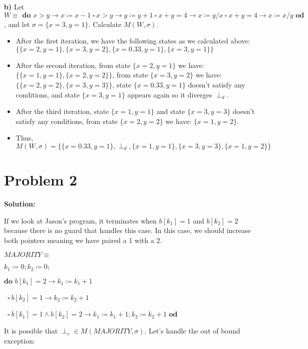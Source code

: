 \documentclass{article}
\begin{document}
\vspace{10pt}
\textbf{b)}  Let $ W \equiv \textbf{ do } x>y \rightarrow x \coloneqq x-1 \ \square \ x>y \rightarrow y \coloneqq y+1 \ \square \ x+y=4 \rightarrow x \coloneqq y/x \ \square \ x+y=4 \rightarrow x \coloneqq x/y \textbf{ od }$, and let $ \sigma = \{ x=3, y=1\} $. Calculate  $ M(W,\sigma) $.

\begin{itemize}
    \item After the first iteration, we have the following states as we calculated above: $\{\{x=2,y=1\},\{x=3,y=2\},\{x=0.33,y=1\},\{x=3,y=1\}\}$
    \item After the second iteration, from state $\{x=2,y=1\}$ we have: $\{\{x=1,y=1\},\{x=2,y=2\}\}$, from state $\{x=3,y=2\}$ we have: $\{\{x=2,y=2\},\{x=3,y=3\}\}$, state $\{x=0.33,y=1\}$ doesn't satisfy any conditions, and state $\{x=3,y=1\}$ appears again so it diverges $\perp_d$.
    \item After the third iteration, state $\{x=1,y=1\}$ and state $\{x=3,y=3\}$ doesn't satisfy any conditions, from state $\{x=2,y=2\}$ we have: $\{x=1,y=2\}$.
    \item Thus, $M(W,\sigma)=\{\{x=0.33,y=1\},\perp_d,\{x=1,y=1\},\{x=3,y=3\},\{x=1,y=2\}\}$
\end{itemize}

\section*{Problem 2}
\textbf{Solution:}

If we look at Jason's program, it terminates when $b[k_1]=1$ and $b[k_2]=2$ because there is no guard that handles this case. In this case, we should increase both pointers meaning we have paired a 1 with a 2.

\qquad $MAJORITY \equiv$

\qquad \qquad $k_1 \coloneqq 0; k_2 \coloneqq 0;$

\qquad \qquad $\textbf{do } b[k_1]=2 \rightarrow k_1 \coloneqq k_1+1$

\qquad \qquad \ $\square \ b[k_2]=1 \rightarrow k_2 \coloneqq k_2+1$

\qquad \qquad \ $\square \ b[k_1]=1 \wedge b[k_2]=2 \rightarrow k_1 \coloneqq k_1+1; k_2 \coloneqq k_2+1 \textbf{ od}$

\vspace{10pt}
It is possible that $\perp_e \in M(MAJORITY, \sigma)$. Let's handle the out of bound exception:
\end{document}
